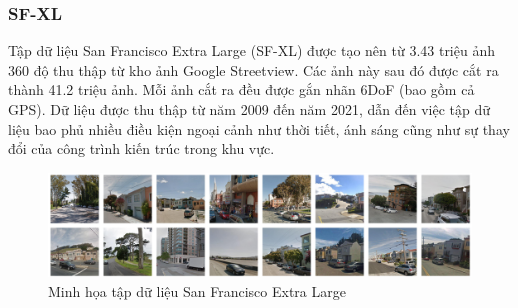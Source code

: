 \subsubsection*{SF-XL}
Tập dữ liệu San Francisco Extra Large (SF-XL) \cite{berton2022rethinking} được tạo nên từ 3.43 triệu ảnh 360 độ thu thập từ kho ảnh Google Streetview. Các ảnh này sau đó được cắt ra thành 41.2 triệu ảnh. Mỗi ảnh cắt ra đều được gắn nhãn 6DoF (bao gồm cả GPS). Dữ liệu được thu thập từ năm 2009 đến năm 2021, dẫn đến việc tập dữ liệu bao phủ nhiều điều kiện ngoại cảnh như thời tiết, ánh sáng cũng như sự thay đổi của công trình kiến trúc trong khu vực.
\begin{figure}[H]
    \centering
    \includegraphics[width=\textwidth]{pics/Chapter2/sfxl.png}
    \caption{Minh họa tập dữ liệu San Francisco Extra Large \cite{berton2022rethinking}}
\end{figure}

